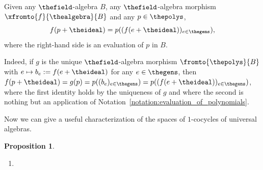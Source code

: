 \documentclass[pdftex]{sigma}
\numberwithin{equation}{section}
\newtheorem{Proposition}[Theorem]{Proposition}
{ \theoremstyle{definition}
\newtheorem{Definition}[Theorem]{Definition}
\newtheorem{Note}[Theorem]{Note}
\newtheorem{Example}[Theorem]{Example}
\newtheorem{Remark}[Theorem]{Remark}
\newtheorem{Notation}[Theorem]{Notation}
\newtheorem{Assumptions}[Theorem]{Assumptions}
}
\begin{document}
{\begin{Remark}
  \label{remark:evaluation_of_polynomials}
  \newcommand{\anyalgebra}{B}
  \newcommand{\anytuple}{b}
  \newcommand{\anygen}{e}
  \newcommand{\anytuplex}[1]{\anytuple_{#1}}
  \newcommand{\anypoly}{p}
  \newcommand{\themorph}{f}
  \newcommand{\bigmorph}{g}
  \newcommand{\theproj}{\pi}
  Given any $\thefield$-algebra $\anyalgebra$,  any $\thefield$-algebra morphism $\xfromto{\themorph}{\thealgebra}{\anyalgebra}$ and any $\anypoly\in\thepolys$,
  \[
    \themorph(\anypoly+\theideal)=\anypoly((\themorph(\anygen+\theideal))_{\anygen\in\thegens}),
  \]
  where  the right-hand side is an evaluation of $\anypoly$ in $\anyalgebra$.

  Indeed, if $\bigmorph$ is the unique $\thefield$-algebra morphism $\fromto{\thepolys}{\anyalgebra}$ with $\anygen\mapsto \anytuplex{\anygen}:= \themorph(\anygen+\theideal)$ for any $\anygen\in\thegens$, then $\themorph(\anypoly+\theideal)=\bigmorph(\anypoly)=\anypoly((\anytuplex{\anygen})_{\anygen\in\thegens})=\anypoly((\themorph(\anygen+\theideal))_{\anygen\in\thegens})$, where the first identity holds by the uniqueness of $\bigmorph$ and where the second is nothing but an application of Notation~\ref{notation:evaluation_of_polynomials}.
\end{Remark}
Now we can give a useful characterization of the spaces of $1$-cocycles of universal algebras.
{
    \newcommand{\somegen}{e}
    \newcommand{\somerel}{r}
    \newcommand{\somevector}{x}
    \newcommand{\anyvector}{z}
    \newcommand{\thetuple}{x}
    \newcommand{\thetuplex}[1]{x_{#1}}
    \newcommand{\somederivation}{\eta}
    \newcommand{\somepoly}{p}
    \begin{Proposition}\quad
      \label{proposition:hochschild-particular-one-cohomology}
      \begin{enumerate}
      \item      \label{proposition:hochschild-particular-one-cohomology-1}


\end{enumerate}
\end{Proposition}}}
\end{document}
